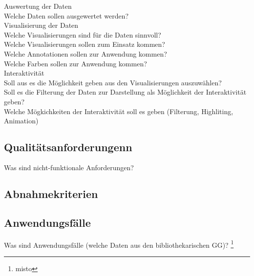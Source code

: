 Auswertung der Daten\\
Welche Daten sollen ausgewertet werden?\\



Visualisierung der Daten\\
Welche Visualisierungen sind für die Daten sinnvoll?\\
Welche Visualisierungen sollen zum Einsatz kommen?\\
Welche Annotationen sollen zur Anwendung kommen?\\
Welche Farben sollen zur Anwendung kommen?\\



Interaktivität\\
Soll aus es die Möglichkeit geben aus den Visualisierungen auszuwählen?\\
Soll es die Filterung der Daten zur Darstellung als Möglichkeit der Interaktivität geben?\\
Welche Mögkichkeiten der Interaktivität soll es geben (Filterung, Highliting, Animation)\\
\subsection{Qualitätsanforderungenn}
Was sind nicht-funktionale Anforderungen?
\subsection{Abnahmekriterien}
\subsection{Anwendungsfälle}
Was sind Anwendungsfälle (welche Daten aus den bibliothekarischen GG)? 
\footnote{misto}